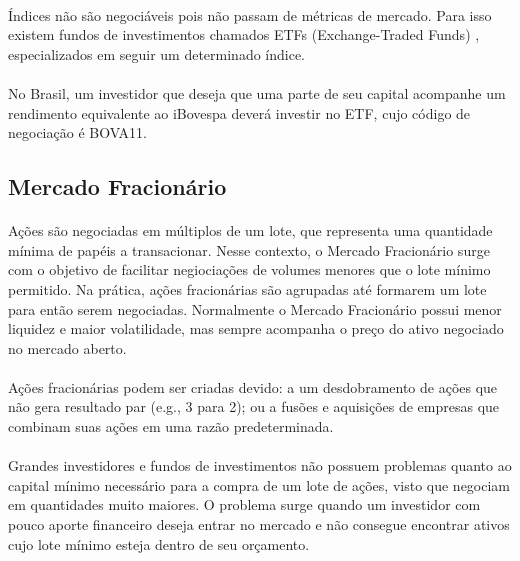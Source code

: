 \paragraph{} Índices não são negociáveis pois não passam de métricas de mercado. Para isso existem fundos de investimentos chamados ETFs (Exchange-Traded Funds) \cite{etf}, especializados em seguir um determinado índice.

\paragraph{} No Brasil, um investidor que deseja que uma parte de seu capital acompanhe um rendimento equivalente ao iBovespa deverá investir no ETF, cujo código de negociação é BOVA11.


\subsection{Mercado Fracionário}

\paragraph{} Ações são negociadas em múltiplos de um lote, que representa uma quantidade mínima de papéis a transacionar. Nesse contexto, o Mercado Fracionário \cite{mercado_fracionario} surge com o objetivo de facilitar negiociações de volumes menores que o lote mínimo permitido. Na prática, ações fracionárias são agrupadas até formarem um lote para então serem negociadas. Normalmente o Mercado Fracionário possui menor liquidez e maior volatilidade, mas sempre acompanha o preço do ativo negociado no mercado aberto.

\paragraph{} Ações fracionárias podem ser criadas devido: a um desdobramento de ações que não gera resultado par (e.g., 3 para 2); ou a fusões e aquisições de empresas que combinam suas ações em uma razão predeterminada.

\paragraph{} Grandes investidores e fundos de investimentos não possuem problemas quanto ao capital mínimo necessário para a compra de um lote de ações, visto que negociam em quantidades muito maiores. O problema surge quando um investidor com pouco aporte financeiro deseja entrar no mercado e não consegue encontrar ativos cujo lote mínimo esteja dentro de seu orçamento.

